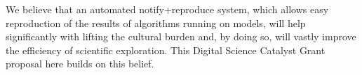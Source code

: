 \documentclass[a4paper,11pt]{article}
\begin{document}
We believe that an automated notify+reproduce system, which allows
easy reproduction of the results of algorithms running on models, will
help significantly with lifting the cultural burden and, by doing so,
will vastly improve the efficiency of scientific exploration.  This
Digital Science Catalyst Grant proposal here builds on this belief.




\end{document}
